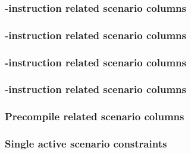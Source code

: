 \subsubsection{-instruction          related scenario columns \lispDone{}}  \label{hub: scenarios: generalities: call}             
\subsubsection{-instruction        related scenario columns \lispDone{}}  \label{hub: scenarios: generalities: create}           
\subsubsection{-instruction        related scenario columns \lispDone{}}  \label{hub: scenarios: generalities: return}           
\subsubsection{-instruction  related scenario columns \lispDone{}}  \label{hub: scenarios: generalities: selfdestruct}     
\subsubsection{Precompile                       related scenario columns \lispDone{}}  \label{hub: scenarios: generalities: precompile}       
\subsubsection{Single active scenario constraints                        \lispDone{}}  \label{hub: scenarios: generalities: single scenario}  
